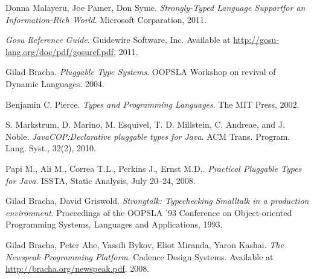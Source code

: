 \begin{thebibliography}{9}

    Donna Malayeru, Joe Pamer, Don Syme.
    \emph{Strongly-Typed Language Supportfor an Information-Rich World}.
    Microsoft Corparation,
    2011.

    \emph{Gosu Reference Guide}.
    Guidewire Software, Inc.
    Available at \url{http://gosu-lang.org/doc/pdf/gosuref.pdf},
    2011.

    Gilad Bracha.
    \emph{Pluggable Type Systems}.
    OOPSLA Workshop on revival of Dynamic Languages.
    2004.

    Benjamin C. Pierce.
    \emph{Types and Programming Languages}.
    The MIT Press, 2002.

    S. Markstrum, D. Marino, M. Esquivel, T. D. Millstein, C. Andreae, and J. Noble.
    \emph{JavaCOP:\@ Declarative pluggable types for Java}.
    ACM Trans. Program. Lang. Syst., 32(2), 2010.

    Papi M., Ali M., Correa T.L., Perkins J., Ernst M.D..
    \emph{Practical Pluggable Types for Java}.
    ISSTA, Static Analysis, July 20–24, 2008.

    Gilad Bracha, David Griswold.
    \emph{Strongtalk: Typechecking Smalltalk in a production environment}.
    Proceedings of the OOPSLA '93 Conference on Object-oriented Programming Systems, Languages and Applications, 1993.

    Gilad Bracha, Peter Ahe, Vassili Bykov, Eliot Miranda, Yaron Kashai.
    \emph{The Newspeak Programming Platform}.
    Cadence Design Systems.
    Available at \url{http://bracha.org/newspeak.pdf},
    2008.

\end{thebibliography}